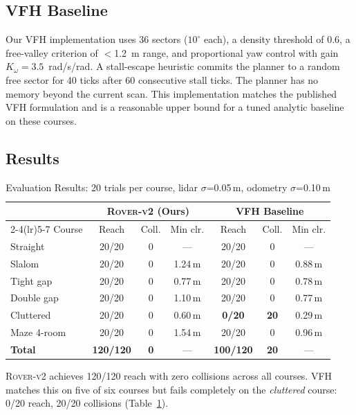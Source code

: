 \documentclass[letterpaper, 10pt, journal]{IEEEtran}
\begin{document}
\subsection{VFH Baseline}

Our VFH implementation uses 36 sectors ($10^\circ$ each), a density threshold of 0.6,
a free-valley criterion of $<$1.2~m range, and proportional yaw control with gain
$K_\omega{=}3.5$~rad/s/rad. A stall-escape heuristic commits the planner to a random
free sector for 40 ticks after 60 consecutive stall ticks. The planner has no memory
beyond the current scan. This implementation matches the published VFH formulation
and is a reasonable upper bound for a tuned analytic baseline on these courses.

\subsection{Results}

\begin{table}[h]
\centering
\caption{Evaluation Results: 20 trials per course, lidar $\sigma$=0.05\,m, odometry $\sigma$=0.10\,m}
\label{tab:results}
\begin{tabular}{@{}lcccccc@{}}
\toprule
 & \multicolumn{3}{c}{\textsc{Rover-v2} (Ours)} & \multicolumn{3}{c}{VFH Baseline} \\
\cmidrule(lr){2-4}\cmidrule(lr){5-7}
Course & Reach & Coll. & Min clr. & Reach & Coll. & Min clr. \\
\midrule
Straight   & 20/20 & 0 & ---    & 20/20 & 0  & ---    \\
Slalom     & 20/20 & 0 & 1.24\,m & 20/20 & 0  & 0.88\,m \\
Tight gap  & 20/20 & 0 & 0.77\,m & 20/20 & 0  & 0.78\,m \\
Double gap & 20/20 & 0 & 1.10\,m & 20/20 & 0  & 0.77\,m \\
Cluttered  & 20/20 & 0 & 0.60\,m & \textbf{0/20}  & \textbf{20} & 0.29\,m \\
Maze 4-room& 20/20 & 0 & 1.54\,m & 20/20 & 0  & 0.96\,m \\
\midrule
\textbf{Total} & \textbf{120/120} & \textbf{0} & --- & \textbf{100/120} & \textbf{20} & --- \\
\bottomrule
\end{tabular}
\end{table}

\textsc{Rover-v2} achieves 120/120 reach with zero collisions across all courses. VFH
matches this on five of six courses but fails completely on the \emph{cluttered}
course: 0/20 reach, 20/20 collisions (Table~\ref{tab:results}).
\end{document}
